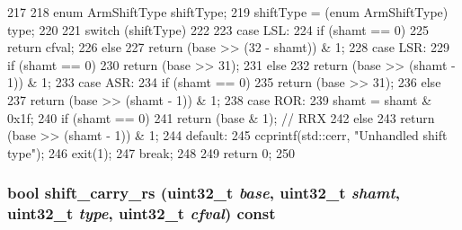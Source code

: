 \begin{DoxyCode}
217 {
218     enum ArmShiftType shiftType;
219     shiftType = (enum ArmShiftType) type;
220 
221     switch (shiftType)
222     {
223       case LSL:
224         if (shamt == 0)
225             return cfval;
226         else
227             return (base >> (32 - shamt)) & 1;
228       case LSR:
229         if (shamt == 0)
230             return (base >> 31);
231         else
232             return (base >> (shamt - 1)) & 1;
233       case ASR:
234         if (shamt == 0)
235             return (base >> 31);
236         else
237             return (base >> (shamt - 1)) & 1;
238       case ROR:
239         shamt = shamt & 0x1f;
240         if (shamt == 0)
241             return (base & 1); // RRX
242         else
243             return (base >> (shamt - 1)) & 1;
244       default:
245         ccprintf(std::cerr, "Unhandled shift type\n");
246         exit(1);
247         break;
248     }
249     return 0;
250 }
\end{DoxyCode}
\hypertarget{classArmISA_1_1ArmStaticInst_a75fefade18d7fe86d23af0c7944eab6b}{
\subsubsection[{shift\_\-carry\_\-rs}]{\setlength{\rightskip}{0pt plus 5cm}bool shift\_\-carry\_\-rs ({\bf uint32\_\-t} {\em base}, \/  {\bf uint32\_\-t} {\em shamt}, \/  {\bf uint32\_\-t} {\em type}, \/  {\bf uint32\_\-t} {\em cfval}) const}}
\label{classArmISA_1_1ArmStaticInst_a75fefade18d7fe86d23af0c7944eab6b}



